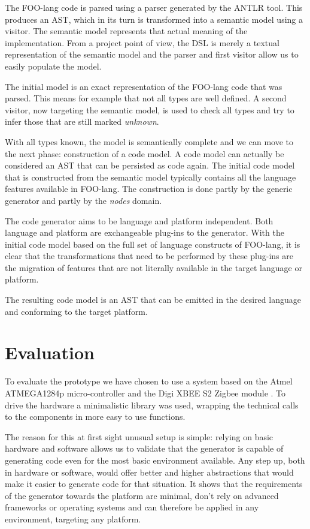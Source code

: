 \documentclass[conference]{IEEEtran}
\begin{document}
The FOO-lang code is parsed using a parser generated by the ANTLR tool. This
produces an AST, which in its turn is transformed into a semantic model using a
visitor. The semantic model represents that actual meaning of the
implementation. From a project point of view, the DSL is merely a textual
representation of the semantic model and the parser and first visitor allow us
to easily populate the model.

The initial model is an exact representation of the FOO-lang code that was
parsed. This means for example that not all types are well defined. A second
visitor, now targeting the semantic model, is used to check all types and try
to infer those that are still marked \emph{unknown}.

With all types known, the model is semantically complete and we can move to the
next phase: construction of a code model. A code model can actually be
considered an AST that can be persisted as code again. The initial code model
that is constructed from the semantic model typically contains all the language
features available in FOO-lang. The construction is done partly by the generic
generator and partly by the \emph{nodes} domain.

The code generator aims to be language and platform independent. Both language
and platform are exchangeable plug-ins to the generator. With the initial code
model based on the full set of language constructs of FOO-lang, it is clear
that the transformations that need to be performed by these plug-ins are the
migration of features that are not literally available in the target language
or platform.

The resulting code model is an AST that can be emitted in the desired language
and conforming to the target platform.

\section{Evaluation}
\label{section:evaluation}

To evaluate the prototype we have chosen to use a system based on the Atmel
ATMEGA1284p micro-controller \cite{datasheet:atmega1284p} and the Digi XBEE S2
Zigbee module \cite{datasheet:xbee}. To drive the hardware a minimalistic
library was used, wrapping the technical calls to the components in more easy
to use functions.

The reason for this at first sight unusual setup is simple: relying on basic
hardware and software allows us to validate that the generator is capable of
generating code even for the most basic environment available. Any step up,
both in hardware or software, would offer better and higher abstractions that
would make it easier to generate code for that situation. It shows that the
requirements of the generator towards the platform are minimal, don't rely on
advanced frameworks or operating systems and can therefore be applied in any
environment, targeting any platform.
\end{document}
